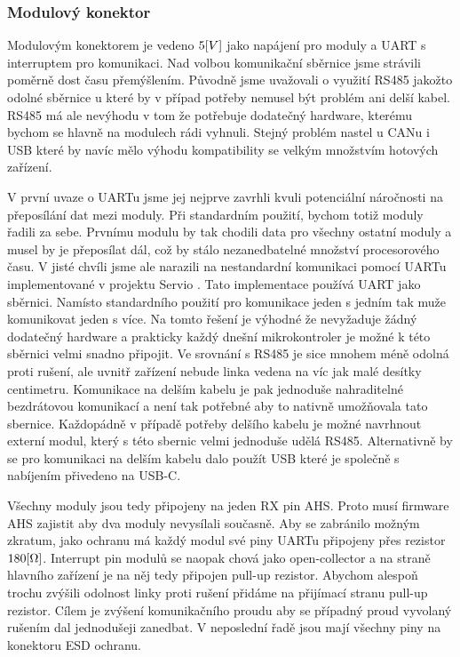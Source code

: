 \subsubsection{Modulový konektor}
Modulovým konektorem je vedeno \(5\-[V]\) jako napájení pro moduly a UART s interruptem pro komunikaci.
Nad volbou komunikační sběrnice jsme strávili poměrně dost času přemýšlením.
Původně jsme uvažovali o využití RS485 jakožto odolné sběrnice u které by v případ potřeby nemusel být problém ani delší kabel.
RS485 má ale nevýhodu v tom že potřebuje dodatečný hardware, kterému bychom se hlavně na modulech rádi vyhnuli.
Stejný problém nastel u CANu i USB které by navíc mělo výhodu kompatibility se velkým množstvím hotových zařízení.

V první uvaze o UARTu jsme jej nejprve zavrhli kvuli potenciální náročnosti na přeposílání dat mezi moduly.
Při standardním použití, bychom totiž moduly řadili za sebe.
Prvnímu modulu by tak chodili data pro všechny ostatní moduly a musel by je přeposílat dál, což by stálo nezanedbatelné množství procesorového času.
V jisté chvíli jsme ale narazili na nestandardní komunikaci pomocí UARTu implementované v projektu Servio \cite{Servio}.
Tato implementace používá UART jako sběrnici.
Namísto standardního použití pro komunikace jeden s jedním tak muže komunikovat jeden s více.
Na tomto řešení je výhodné že nevyžaduje žádný dodatečný hardware a prakticky každý dnešní mikrokontroler je možné k této sběrnici velmi snadno připojit.
Ve srovnání s RS485 je sice mnohem méně odolná proti rušení, ale uvnitř zařízení nebude linka vedena na víc jak malé desítky centimetru.
Komunikace na delším kabelu je pak jednoduše nahraditelné bezdrátovou komunikací a není tak potřebné aby to nativně umožňovala tato sbernice.
Každopádně v případě potřeby delšího kabelu je možné navrhnout externí modul, který s této sbernic velmi jednoduše udělá RS485.
Alternativně by se pro komunikaci na delším kabelu dalo použít USB které je společně s nabíjením přivedeno na USB-C.

Všechny moduly jsou tedy připojeny na jeden RX pin AHS.
Proto musí firmware AHS zajistit aby dva moduly nevysílali současně.
Aby se zabránilo možným zkratum, jako ochranu má každý modul své piny UARTu připojeny přes rezistor \(180\-[\Omega]\).
Interrupt pin modulů se naopak chová jako open-collector a na straně hlavního zařízení je na něj tedy připojen pull-up rezistor.
Abychom alespoň trochu zvýšili odolnost linky proti rušení přidáme na přijímací stranu pull-up rezistor.
Cílem je zvýšení komunikačního proudu aby se případný proud vyvolaný rušením dal jednodušeji zanedbat.
V neposlední řadě jsou mají všechny piny na konektoru ESD ochranu.

